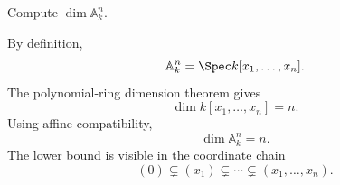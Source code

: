 \begin{problem}\label{prob:vi30-04}
Compute \(\dim\mathbb A^n_k\).

\end{problem}

\ifdefined\FullProblemDossiers
\begin{solution}
By definition,
\[
\mathbb A^n_k=\Spec k[x_1,\ldots,x_n].
\]
The polynomial-ring dimension theorem gives
\[
\dim k[x_1,\ldots,x_n]=n.
\]
Using affine compatibility,
\[
\boxed{\dim\mathbb A^n_k=n}.
\]
The lower bound is visible in the coordinate chain
\[
(0)\subsetneq(x_1)\subsetneq\cdots\subsetneq(x_1,\ldots,x_n).
\]
\end{solution}
\fi
